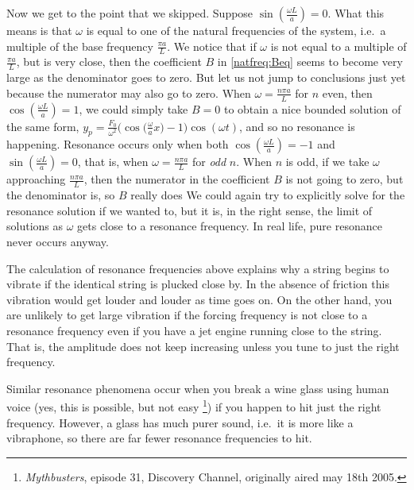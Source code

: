 Now we get to the point that we skipped.  Suppose 
$\sin ( \frac{\omega L}{a} ) = 0$.  What this means is that
$\omega$ is equal to one of the natural frequencies of the system,
i.e.\ a multiple of the base frequency $\frac{\pi a}{L}$.
We notice that if $\omega$
is not equal to a multiple of $\frac{\pi a}{L}$,
but is very close,
then the coefficient $B$ in \eqref{natfreq:Beq} seems to
become very large as the denominator goes to zero.
But let us not jump to conclusions just yet
because the numerator may also go to zero.
When $\omega = \frac{n \pi a}{L}$
for $n$ even, then $\cos (\frac{\omega L}{a}) = 1$,
we could simply
take $B=0$ to obtain a nice bounded solution of the same form,
$y_p = 
\frac{F_0}{\omega^2}
\bigl(
 \cos\bigl(\frac{\omega}{a} x\bigr) -  1 \bigr)
\cos(\omega t)$, and so no resonance is happening.
Resonance occurs only when 
both $\cos (\frac{\omega L}{a}) = -1$ and
$\sin (\frac{\omega L}{a}) = 0$,
that is, when $\omega = \frac{n \pi a }{L}$
for \emph{odd} $n$.
When $n$ is odd, if we take $\omega$ approaching
$\frac{n \pi a }{L}$, then the numerator in the coefficient
$B$ is not going to zero, but the denominator is, so $B$ really does
We could again try to explicitly solve for the resonance solution if we wanted to, but it is, in the right sense, the limit of solutions as $\omega$ gets
close to a resonance frequency.
In real life, pure resonance never occurs anyway.

The calculation of resonance frequencies above explains why a string begins to vibrate if the
identical string is plucked close by.  In the absence of friction this vibration
would get louder and louder as time goes on.
On the other hand, you are unlikely to get large vibration if the forcing 
frequency is not close to a resonance frequency even if you have a jet engine
running close to
the string.  That is, the amplitude does not keep
increasing unless you tune to just the right frequency.

Similar resonance phenomena occur when you break a wine glass using human
voice (yes,
this is possible, but not easy%
\footnote{\emph{Mythbusters}, episode 31, Discovery Channel, originally aired
may 18th 2005.}) if you happen to hit just the right
frequency.  However, a glass has much purer sound, i.e.\ it is more like a
vibraphone, so there are far fewer resonance frequencies to hit.

